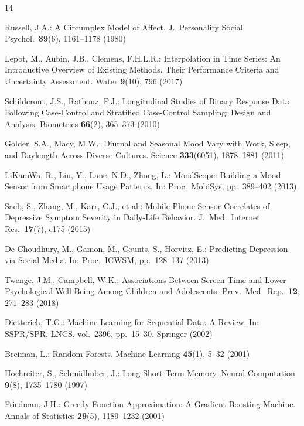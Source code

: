 \documentclass[runningheads]{llncs}
\begin{document}

\begin{thebibliography}{14}

Russell, J.A.: A Circumplex Model of Affect. J.\ Personality Social Psychol.\ \textbf{39}(6), 1161--1178 (1980)

Lepot, M., Aubin, J.B., Clemens, F.H.L.R.: Interpolation in Time Series: An Introductive Overview of Existing Methods, Their Performance Criteria and Uncertainty Assessment. Water \textbf{9}(10), 796 (2017)

Schildcrout, J.S., Rathouz, P.J.: Longitudinal Studies of Binary Response Data Following Case-Control and Stratified Case-Control Sampling: Design and Analysis. Biometrics \textbf{66}(2), 365--373 (2010)

Golder, S.A., Macy, M.W.: Diurnal and Seasonal Mood Vary with Work, Sleep, and Daylength Across Diverse Cultures. Science \textbf{333}(6051), 1878--1881 (2011)

LiKamWa, R., Liu, Y., Lane, N.D., Zhong, L.: MoodScope: Building a Mood Sensor from Smartphone Usage Patterns. In: Proc.\ MobiSys, pp.\ 389--402 (2013)

Saeb, S., Zhang, M., Karr, C.J., et al.: Mobile Phone Sensor Correlates of Depressive Symptom Severity in Daily-Life Behavior. J.\ Med.\ Internet Res.\ \textbf{17}(7), e175 (2015)

De Choudhury, M., Gamon, M., Counts, S., Horvitz, E.: Predicting Depression via Social Media. In: Proc.\ ICWSM, pp.\ 128--137 (2013)

Twenge, J.M., Campbell, W.K.: Associations Between Screen Time and Lower Psychological Well-Being Among Children and Adolescents. Prev.\ Med.\ Rep.\ \textbf{12}, 271--283 (2018)

Dietterich, T.G.: Machine Learning for Sequential Data: A Review. In: SSPR/SPR, LNCS, vol.\ 2396, pp.\ 15--30. Springer (2002)

Breiman, L.: Random Forests. Machine Learning \textbf{45}(1), 5--32 (2001)

Hochreiter, S., Schmidhuber, J.: Long Short-Term Memory. Neural Computation \textbf{9}(8), 1735--1780 (1997)

Friedman, J.H.: Greedy Function Approximation: A Gradient Boosting Machine. Annals of Statistics \textbf{29}(5), 1189--1232 (2001)


\end{thebibliography}
\end{document}
